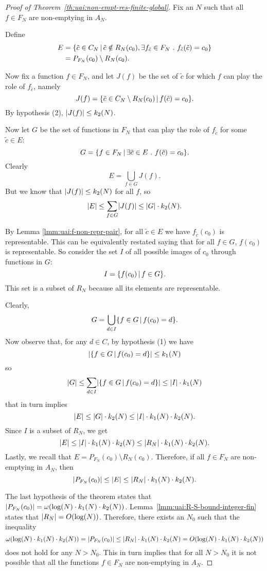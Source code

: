 \begin{proof}[Proof of Theorem~\ref{th:uai:non-empt-res-finite-global}]
	Fix an $N$ such that all $f \in F_N$ are non-emptying in $A_N$.

	Define
	\begin{align*}
		E & = \{ \tilde{c} \in C_N \,\vert\, \tilde{c} \notin R_N(c_0), \exists f_{\tilde{c}} \in F_N\ .\ f_{\tilde{c}}(\tilde{c}) = c_0 \} \\
		  & = P_{F_N}(c_0) \setminus R_N(c_0) .
	\end{align*}

	Now fix a function $f \in F_N$, and let $J(f)$ be the set of $\tilde{c}$ for which $f$ can play the role of $f_{\tilde{c}}$, namely
	\[
	J(f) = \{ \tilde{c} \in C_N \setminus R_N(c_0) \,\vert\, f(\tilde{c}) = c_0 \} .
	\]
	By hypothesis (2), $\lvert J(f)\rvert \le k_2(N)$.

	Now let $G$ be the set of functions in $F_N$ that can play the role of $f_{\tilde{c}}$ for some $\tilde{c} \in E$:
	\[
	G = \{ f \in F_N \,\vert\, \exists \tilde{c} \in E\ .\ f(\tilde{c}) = c_0 \} .
	\]
	Clearly
	\[
	E = \bigcup\limits_{f \in G} J(f) .
	\]
	But we know that $\lvert J(f)\rvert \le k_2(N)$ for all $f$, so
	\[
	\lvert E\rvert \le \sum\limits_{f \in G} \lvert J(f)\rvert \le \lvert G\rvert \cdot k_2(N) .
	\]

	By Lemma \ref{lmm:uai:f-non-repr-pair}, for all $\tilde{c} \in E$ we have $f_{\tilde{c}}(c_0)$ is representable. This can be equivalently restated saying that for all $f \in G$, $f(c_0)$ is representable.
	So consider the set $I$ of all possible images of $c_0$ through functions in $G$:
	\[
	I = \{ f(c_0) \,\vert\, f \in G \} .
	\]
	This set is a subset of $R_N$ because all its elements are representable.

	Clearly,
	\[
	G = \bigcup\limits_{d \in I} \{ f \in G \,\vert\, f(c_0) = d \} .
	\]
	Now observe that, for any $d \in C$, by hypothesis (1) we have
	\[
	\lvert\{ f \in G \,\vert\, f(c_0) = d \}\rvert \le k_1(N)
	\]
	so
	\[
	\lvert G\rvert \le \sum\limits_{d \in I} \lvert\{ f \in G \,\vert\, f(c_0) = d \}\rvert \le \lvert I\rvert \cdot k_1(N)
	\]
	that in turn implies
	\[
	\lvert E\rvert \le \lvert G\rvert \cdot k_2(N) \le \lvert I\rvert \cdot k_1(N) \cdot k_2(N) .
	\]
	Since $I$ is a subset of $R_N$, we get
	\[
	\lvert E\rvert \le \lvert I\rvert \cdot k_1(N) \cdot k_2(N) \le \lvert R_N\rvert \cdot k_1(N) \cdot k_2(N) .
	\]
	Lastly, we recall that $E = P_{F_N}(c_0) \setminus R_N(c_0)$. Therefore, if all $f \in F_N$ are non-emptying in $A_N$, then
	\[
	\lvert P_{F_N}(c_0)\rvert \le \lvert E\rvert \le \lvert R_N\rvert \cdot k_1(N) \cdot k_2(N) .
	\]

	The last hypothesis of the theorem states that $\lvert P_{F_N}(c_0)\rvert = \omega(\log(N) \cdot k_1(N) \cdot k_2(N))$. Lemma~\ref{lmm:uai:R-S-bound-integer-fin} states that $\lvert R_N\rvert = O(\log(N))$.
	Therefore, there exists an $N_0$ such that the inequality
	\[
	\omega(\log(N) \cdot k_1(N) \cdot k_2(N)) = \lvert P_{F_N}(c_0)\rvert \le \lvert R_N\rvert \cdot k_1(N) \cdot k_2(N) = O(\log(N) \cdot k_1(N) \cdot k_2(N))
	\]
	does not hold for any $N > N_0$. This in turn implies that for all $N > N_0$ it is not possible that all the functions $f \in F_N$ are non-emptying in $A_N$.
\end{proof}
